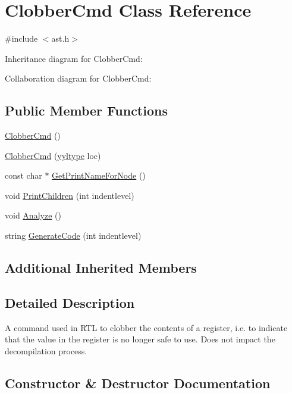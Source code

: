 \hypertarget{class_clobber_cmd}{}\section{Clobber\+Cmd Class Reference}
\label{class_clobber_cmd}


{\ttfamily \#include $<$ast.\+h$>$}



Inheritance diagram for Clobber\+Cmd\+:


Collaboration diagram for Clobber\+Cmd\+:
\subsection*{Public Member Functions}
\begin{DoxyCompactItemize}
\item 
\hyperlink{class_clobber_cmd_ac974e99220fd49e67797d32d56712629}{Clobber\+Cmd} ()
\item 
\hyperlink{class_clobber_cmd_acea57358a5f748e72b0b3e0fea717560}{Clobber\+Cmd} (\hyperlink{structyyltype}{yyltype} loc)
\item 
const char $\ast$ \hyperlink{class_clobber_cmd_a3f817894d2213b11bade9b670b95ef26}{Get\+Print\+Name\+For\+Node} ()
\item 
void \hyperlink{class_clobber_cmd_a45fe80d35161dd6a32ed5d36bd07a5ca}{Print\+Children} (int indentlevel)
\item 
void \hyperlink{class_clobber_cmd_a3f519dc016d05f38518e6ded60afaee1}{Analyze} ()
\item 
string \hyperlink{class_clobber_cmd_adc5627025b63c40f5ca73af8283a3e5c}{Generate\+Code} (int indentlevel)
\end{DoxyCompactItemize}
\subsection*{Additional Inherited Members}


\subsection{Detailed Description}
A command used in R\+TL to clobber the contents of a register, i.\+e. to indicate that the value in the register is no longer safe to use. Does not impact the decompilation process. 

\subsection{Constructor \& Destructor Documentation}
\mbox{\label{class_clobber_cmd_ac974e99220fd49e67797d32d56712629}} 
